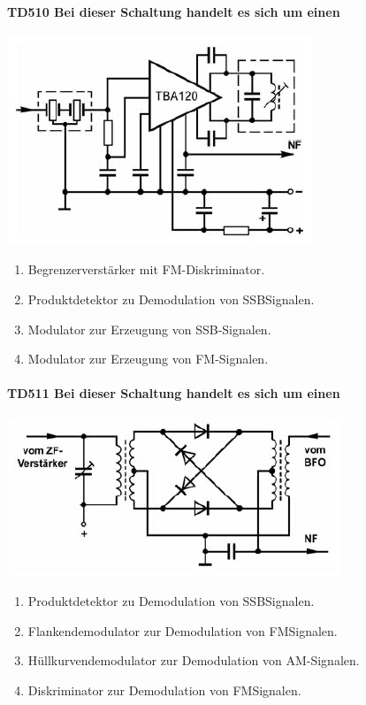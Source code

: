 \documentclass[8pt]{article}
\begin{document}
\begin{enumerate}
\begin{enumerate}[nolistsep,label=\Alph*]
\paragraph*{TD510 Bei dieser Schaltung handelt es sich um einen}
\begin{center}
	\begin{minipage}{\linewidth}
		\centering
		\includegraphics[scale=1.0]{pics/td510_a.jpg}
	\end{minipage}
\end{center}
\begin{enumerate}[nolistsep,label=\Alph*]
\item Begrenzerverstärker mit FM-Diskriminator.
\item Produktdetektor zu Demodulation von SSBSignalen.
\item Modulator zur Erzeugung von SSB-Signalen.
\item Modulator zur Erzeugung von FM-Signalen.
\end{enumerate}

\paragraph*{TD511 Bei dieser Schaltung handelt es sich um einen}
\begin{center}
	\begin{minipage}{\linewidth}
		\centering
		\includegraphics[scale=1.0]{pics/td511_a.jpg}
	\end{minipage}
\end{center}
\begin{enumerate}[nolistsep,label=\Alph*]
\item Produktdetektor zu Demodulation von SSBSignalen.
\item Flankendemodulator zur Demodulation von FMSignalen.
\item Hüllkurvendemodulator zur Demodulation von AM-Signalen.
\item Diskriminator zur Demodulation von FMSignalen.
\end{enumerate}


\end{enumerate}
\end{enumerate}
\end{document}
